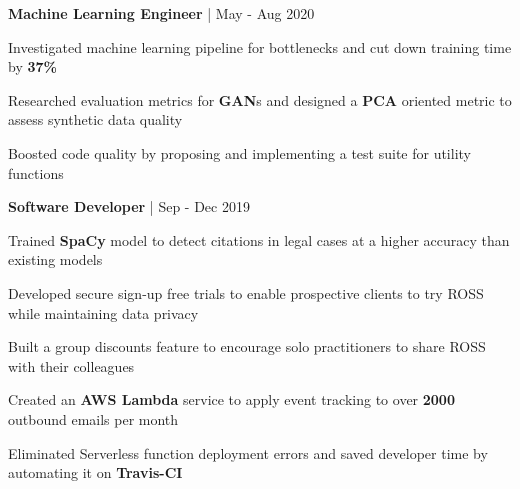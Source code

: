 


\begin{cventries}


\cventry
{\textbf{Machine Learning Engineer} | \color{awesome}{PerkinElmer}}
{May - Aug 2020} %
{ %
\begin{cvitems}
\item {Investigated machine learning pipeline for bottlenecks and cut down training time by \textbf{37\%}}
\item {Researched evaluation metrics for \textbf{GAN}s and designed a \textbf{PCA} oriented metric to assess synthetic data quality}
\item {Boosted code quality by proposing and implementing a test suite for utility functions}
\end{cvitems}
}


\cventry
{\textbf{Software Developer} | \color{awesome}{ROSS Intelligence}}
{Sep - Dec 2019} %
{ %
\begin{cvitems}
\item {Trained \textbf{SpaCy} model to detect citations in legal cases at a higher accuracy than existing models}
\item {Developed secure sign-up free trials to enable prospective clients to try ROSS while maintaining data privacy}
\item {Built a group discounts feature to encourage solo practitioners to share ROSS with their colleagues}
\item {Created an \textbf{AWS Lambda} service to apply event tracking to over \textbf{2000} outbound emails per month}
\item {Eliminated Serverless function deployment errors and saved developer time by automating it on \textbf{Travis-CI}}
\end{cvitems}
}


\end{cventries}
